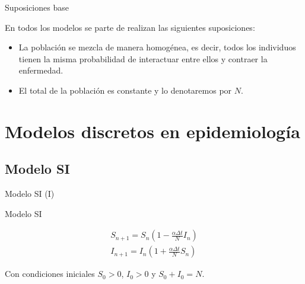 \begin{frame}{Suposiciones base}

    En todos los modelos se parte de realizan las siguientes suposiciones:

    \begin{itemize}
        \item La población se mezcla de manera homogénea, es decir, todos los individuos tienen la misma probabilidad de interactuar entre ellos y contraer la enfermedad.
        \item El total de la población es constante y lo denotaremos por $N$.
    \end{itemize}

\end{frame}




\section{Modelos discretos en epidemiología}


\subsection{Modelo SI}


\begin{frame}{Modelo SI (I)}

    \begin{block}{Modelo SI}

        \begin{equation}
        \label{eqn: SI}
        \begin{aligned}
        S_{n+1}=S_n\left( 1-\frac{\alpha\Delta t}{N}I_n\right) \\
        I_{n+1}=I_n\left( 1+\frac{\alpha\Delta t}{N}S_n\right)
        \end{aligned}
        \end{equation}

        Con condiciones iniciales $S_0>0$, $I_0>0$ y $S_0+I_0=N$.
        

    \end{block}  


\end{frame}

